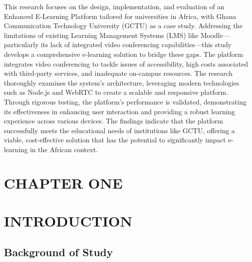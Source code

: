 \documentclass[a4paper,12pt]{article}  %
\begin{document}
This research focuses on the design, implementation, and evaluation of an Enhanced E-Learning Platform tailored for universities in Africa, with Ghana Communication Technology University (GCTU) as a case study. Addressing the limitations of existing Learning Management Systems (LMS) like Moodle—particularly its lack of integrated video conferencing capabilities—this study develops a comprehensive e-learning solution to bridge these gaps. The platform integrates video conferencing to tackle issues of accessibility, high costs associated with third-party services, and inadequate on-campus resources. The research thoroughly examines the system's architecture, leveraging modern technologies such as Node.js and WebRTC to create a scalable and responsive platform. Through rigorous testing, the platform's performance is validated, demonstrating its effectiveness in enhancing user interaction and providing a robust learning experience across various devices. The findings indicate that the platform successfully meets the educational needs of institutions like GCTU, offering a viable, cost-effective solution that has the potential to significantly impact e-learning in the African context.\\
\newpage
\tableofcontents
\newpage
\begin{center}
      \section*{CHAPTER ONE}
      \section{INTRODUCTION}
\end{center}
\subsection{Background of Study}
\end{document}

